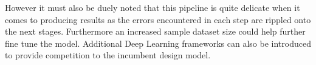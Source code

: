 \documentclass[final,1p,times,twocolumn]{elsarticle}
\begin{document}
However it must also be duely noted that this pipeline is quite delicate when it comes to producing results as the errors encountered in each step are rippled onto the next stages. Furthermore an increased sample dataset size could help further fine tune the model. Additional Deep Learning frameworks can also be introduced to provide competition to the incumbent design model.  
% 
% 

\end{document}
